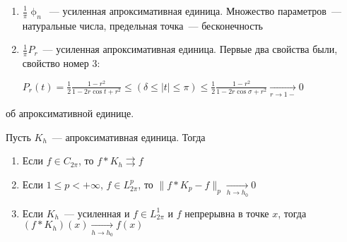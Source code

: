 \begin{examples}
    \leavevmode
    \begin{enumerate}
        \item $\frac{1}{\pi}\upphi_n$~--- усиленная апроксимативная единица. Множество параметров~--- натуральные числа, предельная точка~--- бесконечность
        \item $\frac{1}{\pi}P_r$~--- усиленная апроксимативная единица. Первые два свойства были, свойство номер 3:
        
              $P_r(t) = \frac{1}{2} \frac{1 - r^2}{1 - 2r\cos t + r^2} \leq (\delta \leq |t| \leq \pi) \leq \frac{1}{2} \frac{1 - r^2}{1 - 2r\cos\sigma + r^2} \xrightarrow[r \to 1-]{} 0 $
    \end{enumerate}
\end{examples}

\begin{theorem}
    об апроксимативной единице.
    
    Пусть $K_h$~--- апроксимативная единица. Тогда
    \begin{enumerate}
        \item Если $f \in C_{2\pi}$, то $f \ast K_h \rightrightarrows f$
        \item Если $1 \leq p < +\infty$, $f \in L_{2\pi}^p$, то $\|f\ast K_p - f\|_p \xrightarrow[h \to h_0]{} 0$
        \item Если $K_h$~--- усиленная и $f \in L_{2\pi}^1$ и $f$ непрерывна в точке $x$, тогда $(f \ast K_h)(x) \xrightarrow[h \to h_0]{} f(x)$
    \end{enumerate}
\end{theorem}

